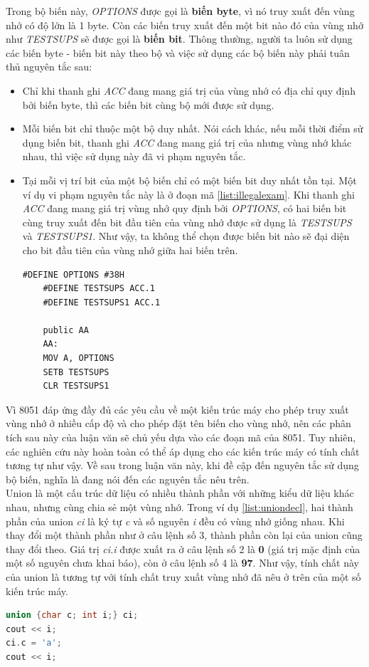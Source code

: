 Trong bộ biến này, \textit{OPTIONS} được gọi là \textbf{biến byte}, vì nó truy xuất đến vùng nhớ có độ lớn là 1 byte. Còn các biến truy xuất đến một bit nào đó của vùng nhớ như \textit{TESTSUPS} sẽ được gọi là \textbf{biến bit}. Thông thường, người ta luôn sử dụng các biến byte - biến bit này theo bộ và việc sử dụng các bộ biến này phải tuân thủ nguyên tắc sau: 
\begin{itemize}
	\item Chỉ khi thanh ghi \textit{ACC} đang mang giá trị của vùng nhớ có địa chỉ quy định bởi biến byte, thì các biến bit cùng bộ mới được sử dụng.
	\item Mỗi biến bit chỉ thuộc một bộ duy nhất. Nói cách khác, nếu mỗi thời điểm sử dụng biến bit, thanh ghi \textit{ACC} đang mang giá trị của nhưng vùng nhớ khác nhau, thì việc sử dụng này đã vi phạm nguyên tắc.
	\item Tại mỗi vị trí bit của một bộ biến chỉ có một biến bit duy nhất tồn tại. Một ví dụ vi phạm nguyên tắc này là ở đoạn mã \ref{list:illegalexam}. Khi thanh ghi \textit{ACC} đang mang giá trị vùng nhớ quy định bởi \textit{OPTIONS}, có hai biến bit cùng truy xuất đến bit đầu tiên của vùng nhớ được sử dụng là \textit{TESTSUPS} và \textit{TESTSUPS1}. Như vậy, ta không thể chọn được biến bit nào sẽ đại diện cho bit đầu tiên của vùng nhớ giữa hai biến trên.
	\begin{lstlisting}[caption={Một ví dụ vi phạm nguyên tắc sử dụng bộ biến},label={list:illegalexam}]
	#DEFINE OPTIONS #38H 
	#DEFINE TESTSUPS ACC.1
	#DEFINE TESTSUPS1 ACC.1
	
	public AA
	AA:
	MOV A, OPTIONS
	SETB TESTSUPS
	CLR TESTSUPS1
	\end{lstlisting}
\end{itemize}
Vì 8051 đáp ứng đầy đủ các yêu cầu về một kiến trúc máy cho phép truy xuất vùng nhớ ở nhiều cấp độ và cho phép đặt tên biến cho vùng nhớ, nên các phân tích sau này của luận văn sẽ chủ yếu dựa vào các đoạn mã của 8051. Tuy nhiên, các nghiên cứu này hoàn toàn có thể áp dụng cho các kiến trúc máy có tính chất tương tự như vậy. Về sau trong luận văn này, khi đề cập đến nguyên tắc sử dụng bộ biến, nghĩa là đang nói đến các nguyên tắc nêu trên. \\

Union là một cấu trúc dữ liệu có nhiều thành phần với những kiểu dữ liệu khác nhau, nhưng cùng chia sẻ một vùng nhớ. Trong ví dụ \ref{list:uniondecl}, hai thành phần của union \textit{ci} là ký tự \textit{c} và số nguyên \textit{i} đều có vùng nhớ giống nhau. Khi thay đổi một thành phần như ở câu lệnh số 3, thành phần còn lại của union cũng thay đổi theo. Giá trị \textit{ci.i} được xuất ra ở câu lệnh số 2 là \textbf{0} (giá trị mặc định của một số nguyên chưa khai báo), còn ở câu lệnh số 4 là \textbf{97}. Như vậy, tính chất này của union là tương tự với tính chất truy xuất vùng nhớ đã nêu ở trên của một số kiến trúc máy.\\
\begin{lstlisting}[caption={Một đoạn khai báo union},label={list:uniondecl},language=c++]
union {char c; int i;} ci;
cout << i;
ci.c = 'a';
cout << i;
\end{lstlisting}

